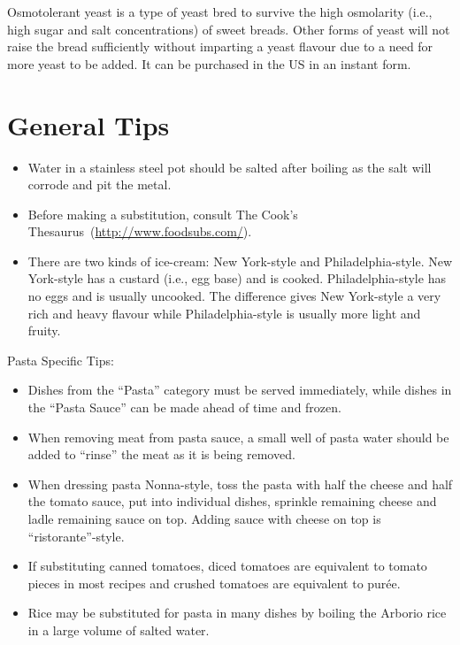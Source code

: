 Osmotolerant yeast is a type of yeast bred to survive the high osmolarity (i.e., high sugar and salt concentrations) of sweet breads. Other forms of yeast will not raise the bread sufficiently without imparting a yeast flavour due to a need for more yeast to be added. It can be purchased in the US in an instant form.

\section{General Tips}
\begin{itemize}
\item Water in a stainless steel pot should be salted after boiling as the salt will corrode and pit the metal.
\item Before making a substitution, consult The Cook's Thesaurus~(\url{http://www.foodsubs.com/}).
\item There are two kinds of ice-cream: New York-style and Philadelphia-style. New York-style has a custard (i.e., egg base) and is cooked. Philadelphia-style has no eggs and is usually uncooked. The difference gives New York-style a very rich and heavy flavour while Philadelphia-style is usually more light and fruity.
\end{itemize}

\noindent Pasta Specific Tips:
\begin{itemize}
\item Dishes from the ``Pasta'' category must be served immediately, while dishes in the ``Pasta Sauce'' can be made ahead of time and frozen.
\item When removing meat from pasta sauce, a small well of pasta water should be added to ``rinse'' the meat as it is being removed.
\item When dressing pasta Nonna-style, toss the pasta with half the cheese and half the tomato sauce, put into individual dishes, sprinkle remaining cheese and ladle remaining sauce on top. Adding sauce with cheese on top is ``ristorante''-style.
\item If substituting canned tomatoes, diced tomatoes are equivalent to tomato pieces in most recipes and crushed tomatoes are equivalent to purée.
\item Rice may be substituted for pasta in many dishes by boiling the Arborio rice in a large volume of salted water.
\end{itemize}

